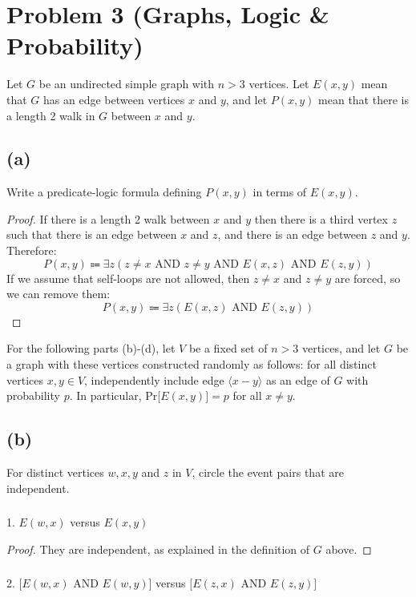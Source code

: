 \documentclass[14pt]{extarticle}
\begin{document}
\section{Problem 3 (Graphs, Logic \& Probability)}
Let $G$ be an undirected simple graph with $n > 3$ vertices. Let $E(x, y)$ mean that $G$ has an edge between vertices $x$ and $y$, and let $P(x, y)$ mean that there is a length 2 walk in $G$ between $x$ and $y$.

\subsection{(a)}
Write a predicate-logic formula defining $P(x, y)$ in terms of $E(x, y)$.
\begin{proof}
If there is a length 2 walk between $x$ and $y$ then there is a third vertex $z$ such that there is an edge between $x$ and $z$, and there is an edge between $z$ and $y$. Therefore:
$$
P(x,y) \Coloneqq \exists z(z \neq x \text{ AND } z \neq y \text{ AND } E(x,z) \text{ AND } E(z,y))
$$
If we assume that self-loops are not allowed, then $z \neq x$ and $z \neq y$ are forced, so we can remove them:
$$
P(x,y) \Coloneqq \exists z(E(x,z) \text{ AND } E(z,y))
$$
\end{proof}

For the following parts (b)-(d), let $V$ be a fixed set of $n > 3$ vertices, and let $G$ be a graph with these vertices constructed randomly as follows: for all distinct vertices $x, y \in V$, independently include edge $\langle x - y\rangle$ as an edge of $G$ with probability $p$. In particular, Pr[$E(x, y)] = p$ for all $x \neq y$.

\subsection{(b)}
For distinct vertices $w, x, y$ and $z$ in $V$, circle the event pairs that are independent.

\subsubsection{}
1. $E(w, x)$ versus $E(x, y)$

\begin{proof}
They are independent, as explained in the definition of $G$ above.
\end{proof}

\subsubsection{}
2. $[E(w, x)$ AND $E(w, y)]$ versus $[E(z, x)$ AND $E(z, y)]$
\end{document}
